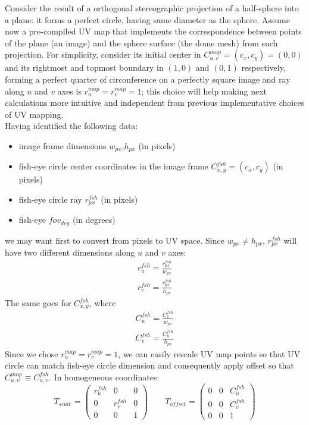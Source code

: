 Consider the result of a orthogonal stereographic projection of a half-sphere into a plane: it forms a perfect circle, having same diameter as the sphere. Assume now a pre-compiled UV map that implements the correspondence between points of the plane (an image) and the sphere surface (the dome mesh) from such projection. For simplicity, consider its initial center in $C^{map}_{u,v}=(c_x,c_y)=(0,0)$ and its rightmost and topmost boundary in $(1,0)$ and $(0,1)$ respectively, forming a perfect quarter of circonference on a perfectly square image and ray along $u$ and $v$ axes is $r^{map}_{u}=r^{map}_{v}=1$; this choice will help making next calculations more intuitive and independent from previous implementative choices of UV mapping.\\
Having identified the following data:
\begin{itemize}
\item image frame dimensions $w_{px}$,$h_{px}$ (in pixels)
\item fish-eye circle center coordinates in the image frame $C^{fsh}_{x,y}=(c_x,c_y)$ (in pixels)
\item fish-eye circle ray $r^{fsh}_{px}$ (in pixels)
\item fish-eye $fov_{deg}$ (in degrees)
\end{itemize}
we may want first to convert from pixels to UV space. Since $w_{px} \ne h_{px}$, $r^{fsh}_{px}$ will have two different dimensions along $u$ and $v$ axes:
\begin{equation}
\begin{array}{c}
r^{fsh}_{u}=\frac{r^{fsh}_{px}}{w_{px}}\\[0.6em]
r^{fsh}_{v}=\frac{r^{fsh}_{px}}{h_{px}}
\end{array}
\end{equation}
The same goes for $C^{fsh}_{x,y}$, where
\begin{equation}
\begin{array}{c}
C^{fsh}_{u}=\frac{C^{fsh}_{x}}{w_{px}}\\[0.6em]
C^{fsh}_{v}=\frac{C^{fsh}_{y}}{h_{px}}
\end{array}
\end{equation}
Since we chose $r^{map}_{u}=r^{map}_{v}=1$, we can easily rescale UV map points so that UV circle can match fish-eye circle dimension and consequently apply offset so that $C^{map}_{u,v} \equiv C^{fsh}_{u,v}$. In homogeneous coordinates:
\begin{equation}
T_{scale} = \left( \begin{array}{ccc}
r^{fsh}_{u} & 0 & 0 \\[0.5em]
0 & r^{fsh}_{v} & 0 \\[0.5em]
0 & 0 & 1
\end{array} \right)
\qquad
T_{offset} = \left( \begin{array}{ccc}
0 & 0 & C^{fsh}_{u} \\[0.5em]
0 & 0 & C^{fsh}_{v} \\[0.5em]
0 & 0 & 1
\end{array} \right)
\label{UV_scale_offset_180}
\end{equation}
